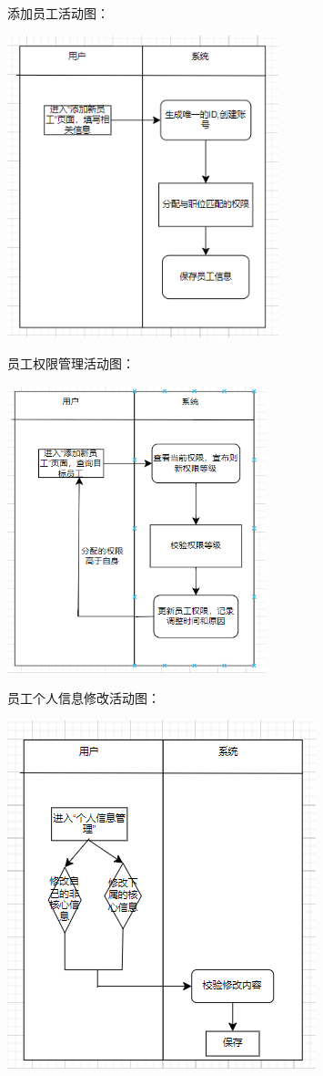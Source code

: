 \documentclass[]{article}
\let\oldincludegraphics\includegraphics
\renewcommand{\includegraphics}[2][]{%
  \begin{center}\oldincludegraphics[#1]{#2}\end{center}%
}
\begin{document}
添加员工活动图：

\includegraphics[width=3.10417in,height=3.45694in]{media/media/image8.png}

员工权限管理活动图：

\includegraphics[width=2.95972in,height=3.28333in]{media/media/image9.png}

员工个人信息修改活动图：

\includegraphics[width=3.53194in,height=3.98264in]{media/media/image10.png}
\end{document}

